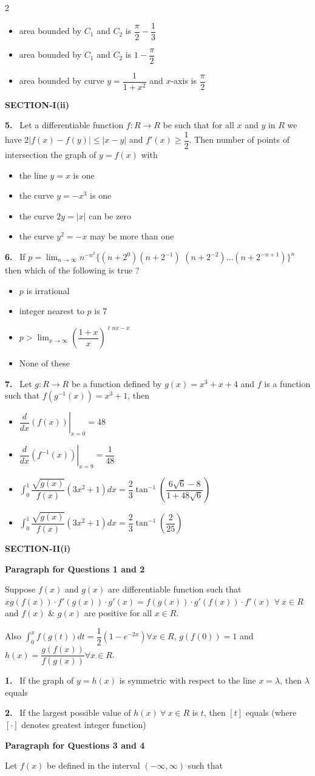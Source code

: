 \documentclass[10pt]{extarticle}
\newcommand{\sect}[1]{\par\smallskip\noindent\textbf{#1}\par}
\newcommand{\qn}[1]{\par\smallskip\noindent\textbf{#1.}~}
\newcommand{\paraq}[2]{\par\smallskip\noindent\textbf{Paragraph for Questions #1 and #2}\par}
\newenvironment{qoptions}{\begin{itemize}[leftmargin=1.8em,itemsep=1pt,topsep=2pt,label={}]}{\end{itemize}}
\newcommand{\opt}[2]{\item[(#1)] #2}
\begin{document}
\begin{multicols}{2}
\begin{qoptions}
\opt{B}{area bounded by $C_1$ and $C_2$ is $\dfrac\pi2-\dfrac13$}
\opt{C}{area bounded by $C_1$ and $C_2$ is $1-\dfrac\pi2$}
\opt{D}{area bounded by curve $y=\dfrac1{1+x^2}$ and $x$-axis is $\dfrac\pi2$}
\end{qoptions}
\sect{SECTION-I(ii)}
\qn{5} Let a differentiable function $f:R\to R$ be such that for all $x$ and $y$ in $R$ we have $2|f(x)-f(y)|\le|x-y|$ and $f'(x)\geqslant\dfrac12$. Then number of points of intersection the graph of $y=f(x)$ with
\begin{qoptions}
\opt{A}{the line $y=x$ is one}
\opt{B}{the curve $y=-x^3$ is one}
\opt{C}{the curve $2y=|x|$ can be zero}
\opt{D}{the curve $y^2=-x$ may be more than one}
\end{qoptions}
\qn{6} If $p=\displaystyle\lim_{n\to\infty}n^{-n^2}\Big\{(n+2^0)(n+2^{-1})$ $(n+2^{-2})\ldots(n+2^{-n+1})\Big\}^n$ then which of the following is true ?
\begin{qoptions}
\opt{A}{$p$ is irrational}
\opt{B}{integer nearest to $p$ is 7}
\opt{C}{$p>\displaystyle\lim_{x\to\infty}\left(\dfrac{1+x}x\right)^{\ell nx-x}$}
\opt{D}{None of these}
\end{qoptions}
\qn{7} Let $g:R\to R$ be a function defined by $g(x)=x^3+x+4$ and $f$ is a function such that $f(g^{-1}(x))=x^3+1$, then
\begin{qoptions}
\opt{A}{$\left.\dfrac d{dx}(f(x))\right|_{x=0}=48$}
\opt{B}{$\left.\dfrac d{dx}\left(f^{-1}(x)\right)\right|_{x=9}=\dfrac1{48}$}
\opt{C}{$\displaystyle\int_0^1\dfrac{\sqrt{g(x)}}{f(x)}\left(3x^2+1\right)dx=\dfrac23\tan^{-1}\left(\dfrac{6\sqrt6-8}{1+48\sqrt6}\right)$}
\opt{D}{$\displaystyle\int_0^1\dfrac{\sqrt{g(x)}}{f(x)}\left(3x^2+1\right)dx=\dfrac23\tan^{-1}\left(\dfrac2{25}\right)$}
\end{qoptions}
\sect{SECTION-II(i)}
\paraq{1}{2}
Suppose $f(x)$ and $g(x)$ are differentiable function such that $xg(f(x))\cdot f'(g(x))\cdot g'(x)=f(g(x))\cdot g'(f(x))\cdot f'(x)$ $\forall\ x\in R$ and $f(x)$ \& $g(x)$ are positive for all $x\in R$.\par
Also $\displaystyle\int_0^xf(g(t))dt=\dfrac12\left(1-e^{-2x}\right)\forall x\in R$, $g(f(0))=1$ and $h(x)=\dfrac{g(f(x))}{f(g(x))}\forall x\in R$.
\qn{1} If the graph of $y=h(x)$ is symmetric with respect to the line $x=\lambda$, then $\lambda$ equals
\qn{2} If the largest possible value of $h(x)\ \forall\ x\in R$ is $t$, then $[t]$ equals (where $[\cdot]$ denotes greatest integer function)
\paraq{3}{4}
Let $f(x)$ be defined in the interval $(-\infty,\infty)$ such that\par

\end{multicols}
\end{document}
